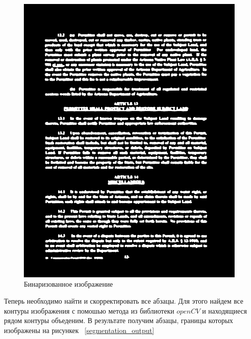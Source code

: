 \begin{figure}
    \includegraphics[scale=0.2]{img/paragraph/thresh.png}
    \caption{Бинаризованное изображение}
    \label{segmentation_threshold}
\end{figure}

Теперь необходимо найти и скорректировать все абзацы. Для этого найдем все контуры изображения с помошью метода из библиотеки $openCV$ \cite{opencv_contours} и находящиеся рядом контуры объеденим.
В результате получим абзацы, границы которых изображены на рисункек ~\ref{segmentation_output}

